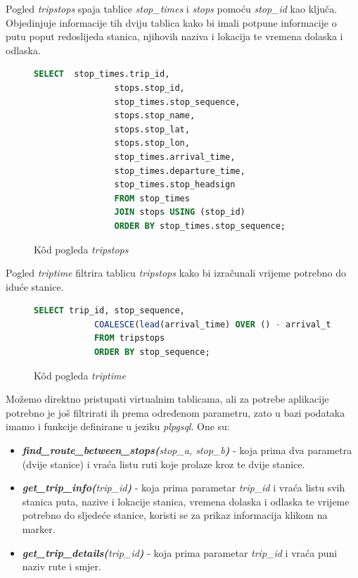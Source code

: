 \documentclass[zavrsnirad]{fer}
\begin{document}
Pogled \textit{tripstops} spaja tablice \textit{stop\_times} i \textit{stops} pomoću \textit{stop\_id} kao ključa. Objedinjuje informacije tih dviju tablica kako bi imali potpune informacije o putu poput redoslijeda stanica, njihovih naziva i lokacija te vremena dolaska i odlaska.
\begin{figure}[h]
	\centering
	\begin{minipage}{0.8\linewidth}
		\begin{lstlisting}[language=SQL]
 		SELECT  stop_times.trip_id,
				stops.stop_id,
				stop_times.stop_sequence,
				stops.stop_name,
				stops.stop_lat,
				stops.stop_lon,
				stop_times.arrival_time,
				stop_times.departure_time,
				stop_times.stop_headsign
				FROM stop_times
				JOIN stops USING (stop_id)
				ORDER BY stop_times.stop_sequence;
		\end{lstlisting}
	\end{minipage}
	\caption{K\^od pogleda \textit{tripstops}}
	\label{slk:tripstops}
\end{figure}

Pogled \textit{triptime} filtrira tablicu \textit{tripstops} kako bi izračunali vrijeme potrebno do iduće stanice.
\begin{figure}[h]
	\centering
	\begin{minipage}{0.8\linewidth}
		\begin{lstlisting}[language=SQL]
			SELECT trip_id, stop_sequence,
			COALESCE(lead(arrival_time) OVER () - arrival_time, '00:00:00'::interval) AS time_till_next_stop
			FROM tripstops
			ORDER BY stop_sequence;
		\end{lstlisting}
	\end{minipage}
	\caption{K\^od pogleda \textit{triptime}}
	\label{slk:triptime}
\end{figure}

Možemo direktno pristupati virtualnim tablicama, ali za potrebe aplikacije potrebno je još filtrirati ih prema određenom parametru, zato u bazi podataka imamo i funkcije definirane u jeziku\textit{ plpgsql}.
One su: 
\begin{itemize}
	\item \textit{\textbf{find\_route\_between\_stops(}stop\_a, stop\_b\textbf{)}} - koja prima dva parametra (dvije stanice) i vraća listu ruti koje prolaze kroz te dvije stanice.
	\item \textit{\textbf{get\_trip\_info(}trip\_id\textbf{)}} - koja prima parametar \textit{trip\_id} i vraća listu svih stanica puta, nazive i lokacije stanica, vremena dolaska i odlaska te vrijeme potrebno do sljedeće stanice, koristi se za prikaz informacija klikom na marker.
	\item \textit{\textbf{get\_trip\_details(}trip\_id\textbf{)}} - koja prima parametar \textit{trip\_id} i vraća puni naziv rute i smjer.
\end{itemize}
\end{document}
